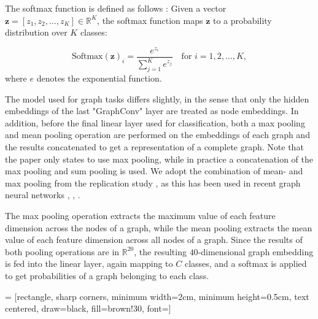 The softmax function is defined as follows \cite{Goodfellow-et-al-2016}:
Given a vector \( \mathbf{z} = [z_1, z_2, \dots, z_K] \in \mathbb{R}^K \), the softmax function maps \( \mathbf{z} \) to a probability distribution over \( K \) classes:

\begin{equation}
    \text{Softmax}(\mathbf{z})_i = \frac{e^{z_i}}{\sum_{j=1}^{K} e^{z_j}} \quad \text{for } i = 1, 2, \dots, K,
\end{equation}
where $e$ denotes the exponential function. \bigskip

The model used for graph tasks differs slightly, in the sense that only the hidden embeddings of the last "GraphConv" layer are treated as node embeddings. In addition, before the final linear layer used for classification, both a max pooling and mean pooling operation are performed on the embeddings of each graph and the results concatenated to get a representation of a complete graph. Note that the paper only states to use max pooling, while in practice a concatenation of the max pooling and sum pooling is used. We adopt the combination of mean- and max pooling from the replication study \cite{holdijk2021re}, as this has been used in recent graph neural networks \cite{simonovsky2017dynamic}, \cite{ma2021unsupervised}, \cite{zhao2023faithful}. 

The max pooling operation extracts the maximum value of each feature dimension across the nodes of a graph, while the mean pooling extracts the mean value of each feature dimension across all nodes of a graph. Since the results of both pooling operations are in $\mathbb{R}^{20}$, the resulting $40$-dimensional graph embedding is fed into the linear layer, again mapping to $C$ classes, and a softmax is applied to get probabilities of a graph belonging to each class.\bigskip

 = [rectangle, sharp corners, minimum width=2cm, minimum height=0.5cm, text centered, draw=black, fill=brown!30, font=\small]

